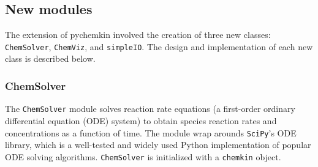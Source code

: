 \documentclass[12pt]{article}
\begin{document}
\subsection{New modules}
The extension of pychemkin involved the creation of three new classes: \texttt{ChemSolver}, \texttt{ChemViz}, and \texttt{simpleIO}. The design and implementation of each new class is described below. 
\subsubsection{ChemSolver}
The \texttt{ChemSolver} module solves reaction rate equations (a first-order ordinary differential equation (ODE) system) to obtain species reaction rates and concentrations as a function of time. The module wrap arounds \texttt{SciPy}'s ODE library, which is a well-tested and widely used Python implementation of popular ODE solving algorithms. \texttt{ChemSolver} is initialized with a \texttt{chemkin} object. 
\end{document}
